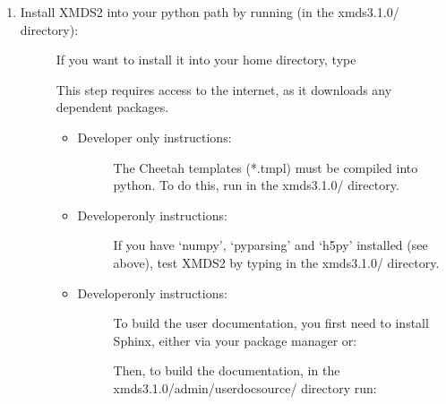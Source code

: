 \documentclass[letterpaper,10pt,english]{sphinxmanual}
\begin{document}
\begin{enumerate}
\begin{enumerate}
\begin{description}
\end{description}

\end{enumerate}

\item {} \begin{description}
\item[{Install XMDS2 into your python path by running (in the xmds\sphinxhyphen{}3.1.0/ directory):}] \leavevmode
\sphinxAtStartPar
{}

\sphinxAtStartPar
If you want to install it into your home directory, type 

\sphinxAtStartPar
This step requires access to the internet, as it downloads any dependent packages.
\begin{itemize}
\item {} \begin{description}
\item[{Developer only instructions:}] \leavevmode
\sphinxAtStartPar
The Cheetah templates (*.tmpl) must be compiled into python.
To do this, run  in the xmds\sphinxhyphen{}3.1.0/ directory.

\end{description}

\item {} \begin{description}
\item[{Developer\sphinxhyphen{}only instructions:}] \leavevmode
\sphinxAtStartPar
If you have ‘numpy’, ‘pyparsing’ and ‘h5py’ installed (see above), test XMDS2 by typing  in the xmds\sphinxhyphen{}3.1.0/ directory.

\end{description}

\item {} \begin{description}
\item[{Developer\sphinxhyphen{}only instructions:}] \leavevmode
\sphinxAtStartPar
To build the user documentation, you first need to install Sphinx, either via your package manager or:

\sphinxAtStartPar
Then, to build the documentation, in the xmds\sphinxhyphen{}3.1.0/admin/userdoc\sphinxhyphen{}source/ directory run: 


\end{description}
\end{itemize}
\end{description}
\end{enumerate}
\end{document}
